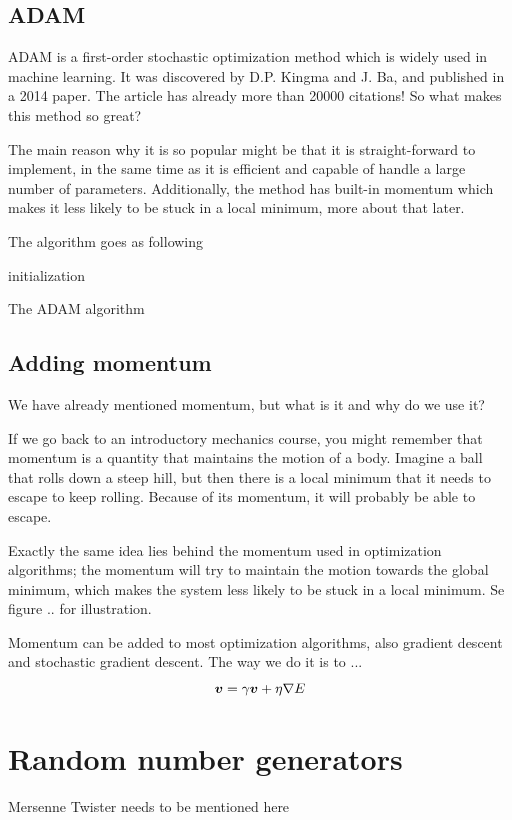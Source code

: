 \subsection{ADAM}
ADAM is a first-order stochastic optimization method which is widely used in machine learning. It was discovered by D.P. Kingma and J. Ba, and published in a 2014 paper. The article has already more than 20000 citations! \cite{kingma_adam:_2014} So what makes this method so great? 

The main reason why it is so popular might be that it is straight-forward to implement, in the same time as it is efficient and capable of handle a large number of parameters. Additionally, the method has built-in momentum which makes it less likely to be stuck in a local minimum, more about that later.

The algorithm goes as following

\begin{algorithm}[H]
\SetAlgoLined
{}
initialization\;
\caption{The ADAM algorithm}
\end{algorithm}

\subsection{Adding momentum}
We have already mentioned momentum, but what is it and why do we use it?

If we go back to an introductory mechanics course, you might remember that momentum is a quantity that maintains the motion of a body. Imagine a ball that rolls down a steep hill, but then there is a local minimum that it needs to escape to keep rolling. Because of its momentum, it will probably be able to escape. 

Exactly the same idea lies behind the momentum used in optimization algorithms; the momentum will try to maintain the motion towards the global minimum, which makes the system less likely to be stuck in a local minimum. Se figure .. for illustration. 

Momentum can be added to most optimization algorithms, also gradient descent and stochastic gradient descent. The way we do it is to ...
\begin{equation}
\boldsymbol{{v}} = \gamma\boldsymbol{{v}} + \eta\nabla E
\end{equation}



\section{Random number generators} \label{sec:RNG}
Mersenne Twister needs to be mentioned here